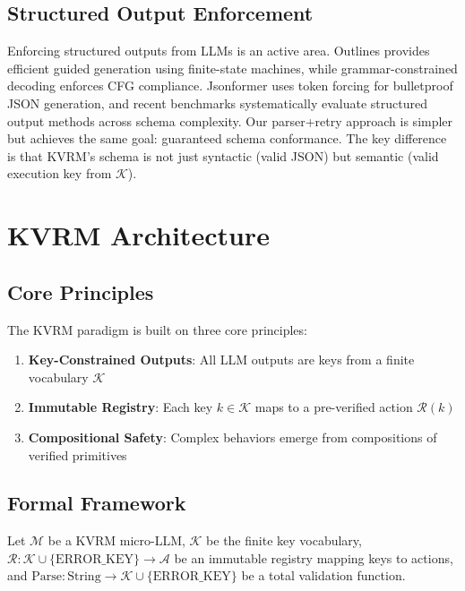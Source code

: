 \documentclass[11pt,a4paper]{article}
\begin{document}
\subsection{Structured Output Enforcement}

Enforcing structured outputs from LLMs is an active area. Outlines \citep{willard2023outlines} provides efficient guided generation using finite-state machines, while grammar-constrained decoding \citep{geng2023grammar} enforces CFG compliance. Jsonformer \citep{jsonformer2023} uses token forcing for bulletproof JSON generation, and recent benchmarks \citep{geng2025structuredoutputs, agrawal2024solm} systematically evaluate structured output methods across schema complexity. Our parser+retry approach is simpler but achieves the same goal: guaranteed schema conformance. The key difference is that KVRM's schema is not just syntactic (valid JSON) but semantic (valid execution key from $\mathcal{K}$).

\section{KVRM Architecture}
\label{sec:architecture}

\subsection{Core Principles}

The KVRM paradigm is built on three core principles:

\begin{enumerate}
    \item \textbf{Key-Constrained Outputs}: All LLM outputs are keys from a finite vocabulary $\mathcal{K}$
    \item \textbf{Immutable Registry}: Each key $k \in \mathcal{K}$ maps to a pre-verified action $\mathcal{R}(k)$
    \item \textbf{Compositional Safety}: Complex behaviors emerge from compositions of verified primitives
\end{enumerate}

\subsection{Formal Framework}

Let $\mathcal{M}$ be a KVRM micro-LLM, $\mathcal{K}$ be the finite key vocabulary, $\mathcal{R}: \mathcal{K} \cup \{\text{ERROR\_KEY}\} \rightarrow \mathcal{A}$ be an immutable registry mapping keys to actions, and $\text{Parse}: \text{String} \rightarrow \mathcal{K} \cup \{\text{ERROR\_KEY}\}$ be a total validation function.
\end{document}

